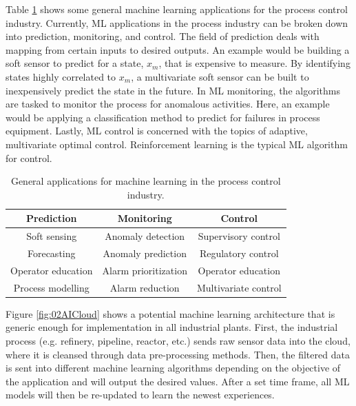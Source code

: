 Table \ref{tab:2MLApplications} shows some general machine learning applications for the process control industry. Currently, ML applications in the process industry can be broken down into prediction, monitoring, and control.  The field of prediction deals with mapping from certain inputs to desired outputs. An example would be building a soft sensor to predict for a state, $x_{m}$, that is expensive to measure.  By identifying states highly correlated to $x_{m}$, a multivariate soft sensor can be built to inexpensively predict the state in the future. In ML monitoring, the algorithms are tasked to monitor the process for anomalous activities. Here, an example would be applying a classification method to predict for failures in process equipment.  Lastly, ML control is concerned with the topics of adaptive, multivariate optimal control. Reinforcement learning is the typical ML algorithm for control.  

\begin{table}[h]
    \centering
    {
    \begin{tabular}{c|c|c}
    Prediction & Monitoring & Control \\ \hline
    Soft sensing & Anomaly detection & Supervisory control \\
    Forecasting  & Anomaly prediction & Regulatory control \\
    Operator education  & Alarm prioritization & Operator education \\
    Process modelling  & Alarm reduction & Multivariate control\\
    \end{tabular}}
    \caption{General applications for machine learning in the process control industry.}
    \label{tab:2MLApplications}
\end{table}

 Figure \ref{fig:02AICloud} shows a potential machine learning architecture that is generic enough for implementation in all industrial plants. First, the industrial process (e.g. refinery, pipeline, reactor, etc.) sends raw sensor data into the cloud, where it is cleansed through data pre-processing methods.  Then, the filtered data is sent into different machine learning algorithms depending on the objective of the application and will output the desired values.  After a set time frame, all ML models will then be re-updated to learn the newest experiences. 

